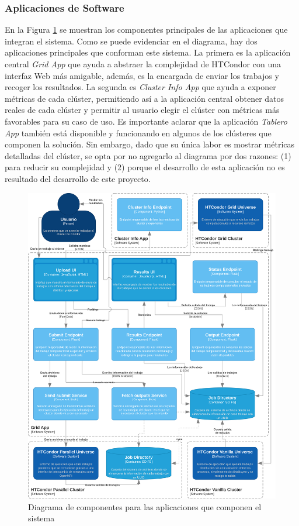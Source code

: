 \subsubsection{Aplicaciones de Software}
\noindent
En la Figura \ref{fig:C4Nivel3Apps} se muestran los componentes principales de las aplicaciones que integran el sistema. Como se puede evidenciar en el diagrama, hay dos aplicaciones principales que conforman este sistema. La primera es la aplicación central \textit{Grid App} que ayuda a abstraer la complejidad de HTCondor con una interfaz Web más amigable, además, es la encargada de enviar los trabajos y recoger los resultados. La segunda es \textit{Cluster Info App} que ayuda a exponer métricas de cada clúster, permitiendo así a la aplicación central obtener datos reales de cada clúster y permitir al usuario elegir el clúster con métricas más favorables para su caso de uso. Es importante aclarar que la aplicación \textit{Tablero App} también está disponible y funcionando en algunos de los clústeres que componen la solución. Sin embargo, dado que su única labor es mostrar métricas detalladas del clúster, se opta por no agregarlo al diagrama por dos razones: (1) para reducir su complejidad y (2) porque el desarrollo de esta aplicación no es resultado del desarrollo de este proyecto.

\begin{figure}[H]
	\centering
	\includegraphics[scale=0.09]{tablas-images/C4/Diagramas HTCondor-Nivel 3 - Apps.drawio.png}
	\caption{Diagrama de componentes para las aplicaciones que componen el sistema}
    \label{fig:C4Nivel3Apps}
\end{figure}

